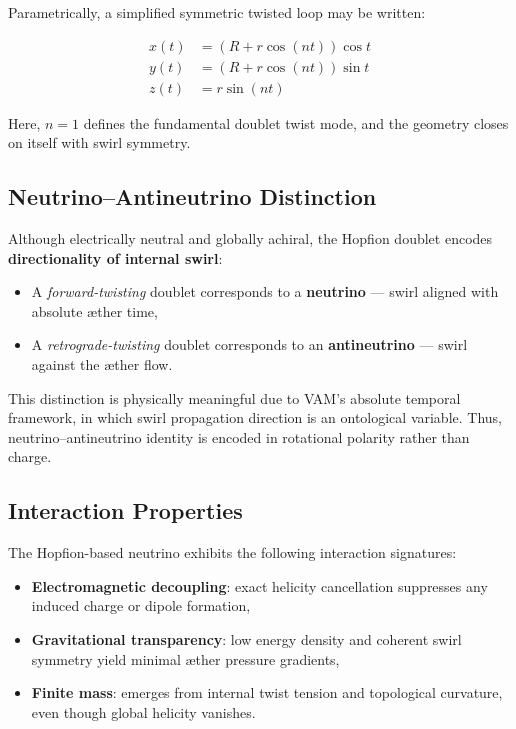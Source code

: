 Parametrically, a simplified symmetric twisted loop may be written:

\begin{equation}
\begin{aligned}
x(t) &= \left( R + r \cos(n t) \right) \cos t \\
y(t) &= \left( R + r \cos(n t) \right) \sin t \\
z(t) &= r \sin(n t)
\end{aligned}
\end{equation}

Here, \(n = 1\) defines the fundamental doublet twist mode, and the geometry closes on itself with swirl symmetry.

\subsection{Neutrino–Antineutrino Distinction}

Although electrically neutral and globally achiral, the Hopfion doublet encodes \textbf{directionality of internal swirl}:

\begin{itemize}
    \item A \emph{forward-twisting} doublet corresponds to a \textbf{neutrino} — swirl aligned with absolute æther time,
    \item A \emph{retrograde-twisting} doublet corresponds to an \textbf{antineutrino} — swirl against the æther flow.
\end{itemize}

This distinction is physically meaningful due to VAM’s absolute temporal framework, in which swirl propagation direction is an ontological variable. Thus, neutrino–antineutrino identity is encoded in rotational polarity rather than charge.

\subsection{Interaction Properties}

The Hopfion-based neutrino exhibits the following interaction signatures:

\begin{itemize}
    \item \textbf{Electromagnetic decoupling}: exact helicity cancellation suppresses any induced charge or dipole formation,
    \item \textbf{Gravitational transparency}: low energy density and coherent swirl symmetry yield minimal æther pressure gradients,
    \item \textbf{Finite mass}: emerges from internal twist tension and topological curvature, even though global helicity vanishes.
\end{itemize}


